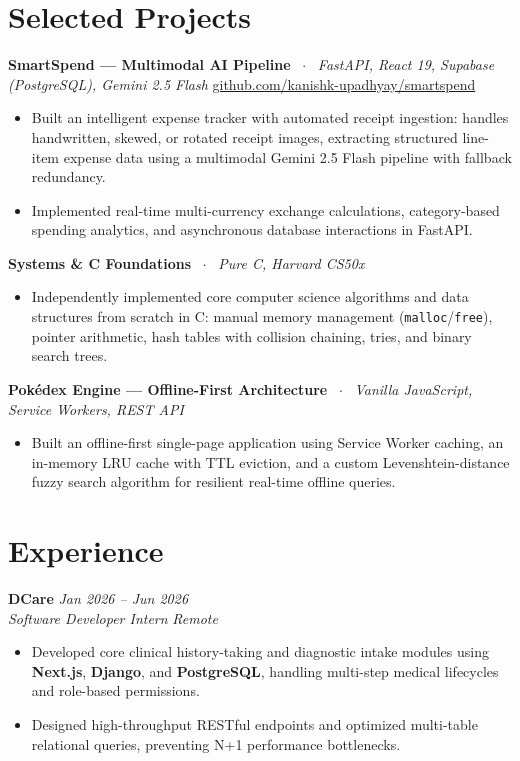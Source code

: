 \documentclass[10pt,a4paper]{article}
\begin{document}
\section{Selected Projects}
\textbf{SmartSpend — Multimodal AI Pipeline} \ $\cdot$ \ \textit{FastAPI, React 19, Supabase (PostgreSQL), Gemini 2.5 Flash} \hfill \href{https://github.com/kanishk-upadhyay/smartspend}{github.com/kanishk-upadhyay/smartspend}
\begin{itemize}
    \item Built an intelligent expense tracker with automated receipt ingestion: handles handwritten, skewed, or rotated receipt images, extracting structured line-item expense data using a multimodal Gemini 2.5 Flash pipeline with fallback redundancy.
    \item Implemented real-time multi-currency exchange calculations, category-based spending analytics, and asynchronous database interactions in FastAPI.
\end{itemize}

\textbf{Systems \& C Foundations} \ $\cdot$ \ \textit{Pure C, Harvard CS50x}
\begin{itemize}
    \item Independently implemented core computer science algorithms and data structures from scratch in C: manual memory management (\texttt{malloc}/\texttt{free}), pointer arithmetic, hash tables with collision chaining, tries, and binary search trees.
\end{itemize}

\textbf{Pokédex Engine — Offline-First Architecture} \ $\cdot$ \ \textit{Vanilla JavaScript, Service Workers, REST API}
\begin{itemize}
    \item Built an offline-first single-page application using Service Worker caching, an in-memory LRU cache with TTL eviction, and a custom Levenshtein-distance fuzzy search algorithm for resilient real-time offline queries.
\end{itemize}

\section{Experience}
\textbf{DCare} \hfill \textit{Jan 2026 -- Jun 2026} \\
\textit{Software Developer Intern} \hfill \textit{Remote}
\begin{itemize}
    \item Developed core clinical history-taking and diagnostic intake modules using \textbf{Next.js}, \textbf{Django}, and \textbf{PostgreSQL}, handling multi-step medical lifecycles and role-based permissions.
    \item Designed high-throughput RESTful endpoints and optimized multi-table relational queries, preventing N+1 performance bottlenecks.
\end{itemize}
\end{document}
